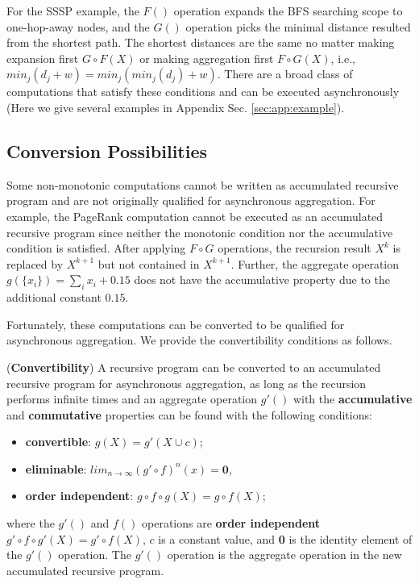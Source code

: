 For the SSSP example, the $F()$ operation expands the BFS searching scope to one-hop-away nodes, and the $G()$ operation picks the minimal distance resulted from the shortest path. The shortest distances are the same no matter making expansion first $G\circ F(X)$ or making aggregation first $F\circ G(X)$, i.e., $min_j(d_j+w)=min_j(min_j(d_j)+w)$. There are a broad class of computations that satisfy these conditions and can be executed asynchronously (Here we give several examples in Appendix Sec. \ref{sec:app:example}).


\subsection{Conversion Possibilities}
\label{sec:async:convert}

Some non-monotonic computations cannot be written as accumulated recursive program and are not originally qualified for asynchronous aggregation. For example, the PageRank computation cannot be executed as an accumulated recursive program since neither the monotonic condition nor the accumulative condition is satisfied. After applying $F\circ G$ operations, the recursion result $X^{k}$ is replaced by $X^{k+1}$ but not contained in $X^{k+1}$. Further, the aggregate operation $g(\{x_i\})=\sum_i{x_i}+0.15$ does not have the accumulative property due to the additional constant $0.15$.

Fortunately, these computations can be converted to be qualified for asynchronous aggregation. We provide the convertibility conditions as follows.

\begin{theorem}
	\label{th:convert}
	(\textbf{Convertibility}) A recursive program can be converted to an accumulated recursive program for asynchronous aggregation, as long as the recursion performs infinite times and an aggregate operation $g'()$ with the \textbf{accumulative} and \textbf{commutative} properties can be found with the following conditions:
	\begin{itemize}
		\item \textbf{convertible}: $g(X)=g'(X\cup c)$;
		\item \textbf{eliminable}: $lim_{n\rightarrow\infty}(g'\circ f)^n(x)=\textbf{0}$,
\item \textbf{order independent}: $g\circ f\circ g(X)=g\circ f(X)$;
	\end{itemize}
	where the $g'()$ and $f()$ operations are \textbf{order independent} $g'\circ f\circ g'(X)=g'\circ f(X)$, $c$ is a constant value, and \textbf{0} is the identity element of the $g'()$ operation. The $g'()$ operation is the aggregate operation in the new accumulated recursive program.
\end{theorem}

